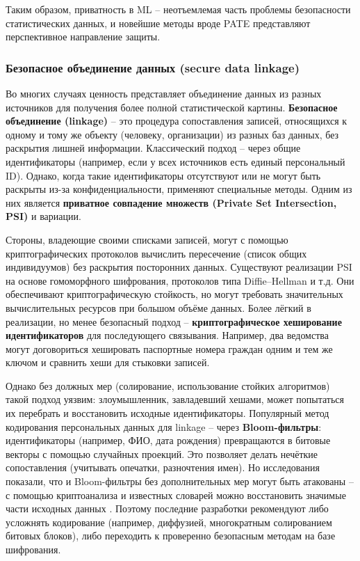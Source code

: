 Таким образом, приватность в ML –
неотъемлемая часть проблемы безопасности статистических данных, и новейшие методы вроде PATE представляют перспективное
направление защиты.

\subsubsection{Безопасное объединение данных (secure data linkage)}

Во многих случаях ценность представляет объединение данных из разных источников для получения более полной
статистической картины. \textbf{Безопасное объединение (linkage)} – это процедура сопоставления записей, относящихся к
одному и тому же объекту (человеку, организации) из разных баз данных, без раскрытия лишней информации. Классический
подход – через общие идентификаторы (например, если у всех источников есть единый персональный ID). Однако, когда такие
идентификаторы отсутствуют или не могут быть раскрыты из-за конфиденциальности, применяют специальные методы. Одним из
них является \textbf{приватное совпадение множеств (Private Set Intersection, PSI)} и вариации.

Стороны, владеющие своими списками записей, могут с помощью криптографических протоколов вычислить пересечение (список общих индивидуумов) 
без раскрытия посторонних данных. Существуют реализации PSI на основе гомоморфного шифрования, протоколов типа
Diffie–Hellman и т.д. Они обеспечивают криптографическую стойкость, но могут требовать значительных вычислительных
ресурсов при большом объёме данных. Более лёгкий в реализации, но менее безопасный подход – \textbf{криптографическое
хеширование идентификаторов} для последующего связывания. Например, два ведомства могут договориться хешировать
паспортные номера граждан одним и тем же ключом и сравнить хеши для стыковки записей.

Однако без должных мер (солирование, использование стойких алгоритмов) такой подход уязвим: злоумышленник, завладевший хешами, может 
попытаться их перебрать и восстановить исходные идентификаторы. Популярный метод кодирования персональных данных для linkage –
через \textbf{Bloom-фильтры}: идентификаторы (например, ФИО, дата рождения) превращаются в битовые векторы с помощью
случайных проекций. Это позволяет делать нечёткие сопоставления (учитывать опечатки, разночтения имен). Но исследования
показали, что и Bloom-фильтры без дополнительных мер могут быть атакованы – с помощью криптоанализа и известных словарей
можно восстановить значимые части исходных данных \autocite{journalprivacyconfidentiality-org}. Поэтому последние
разработки рекомендуют либо усложнять кодирование (например, диффузией, многократным солированием битовых блоков), либо
переходить к проверенно безопасным методам на базе шифрования.


